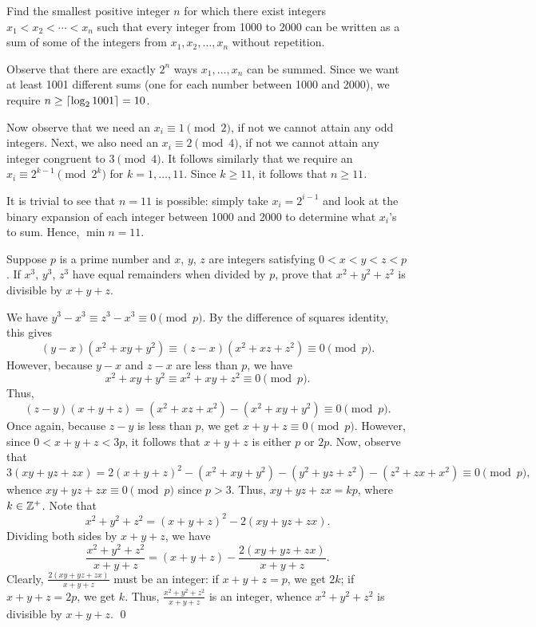 \begin{question}[11]\label{A::2024-S-2-3}
    Find the smallest positive integer $n$ for which there exist integers $x_1 < x_2 < \cdots < x_n$ such that every integer from 1000 to 2000 can be written as a sum of some of the integers from $x_1, x_2, \ldots, x_n$ without repetition.
\end{question}
\begin{solution*}
    Observe that there are exactly $2^n$ ways $x_1, \ldots, x_n$ can be summed. Since we want at least 1001 different sums (one for each number between 1000 and 2000), we require $n \geq \left\lceil \log_2 1001 \right\rceil = 10$.

    Now observe that we need an $x_i \equiv 1 \pmod{2}$, if not we cannot attain any odd integers. Next, we also need an $x_i \equiv 2 \pmod{4}$, if not we cannot attain any integer congruent to $3 \pmod{4}$. It follows similarly that we require an $x_i \equiv 2^{k-1} \pmod{2^k}$ for $k = 1, \ldots, 11$. Since $k \geq 11$, it follows that $n \geq 11$.

    It is trivial to see that $n = 11$ is possible: simply take $x_i = 2^{i-1}$ and look at the binary expansion of each integer between 1000 and 2000 to determine what $x_i$'s to sum. Hence, $\min n = 11$.
\end{solution*}

\begin{question}\label{A::2024-S-2-4}
    Suppose $p$ is a prime number and $x$, $y$, $z$ are integers satisfying $0 < x < y < z < p$. If $x^3$, $y^3$, $z^3$ have equal remainders when divided by $p$, prove that $x^2 + y^2 + z^2$ is divisible by $x + y + z$.
\end{question}

\begin{solution*}
    We have $y^3 - x^3 \equiv z^3 - x^3 \equiv 0 \pmod{p}$. By the difference of squares identity, this gives \[(y-x)(x^2 + xy + y^2) \equiv (z-x)(x^2 + xz + z^2) \equiv 0 \pmod{p}.\] However, because $y - x$ and $z - x$ are less than $p$, we have \[x^2 + xy + y^2 \equiv x^2 + xy + z^2 \equiv 0 \pmod{p}.\] Thus, \[(z-y)(x + y + z) = (x^2 + xz + x^2) - (x^2 + xy + y^2) \equiv 0 \pmod{p}.\] Once again, because $z - y$ is less than $p$, we get $x + y + z \equiv 0 \pmod{p}$. However, since $0 < x + y + z < 3p$, it follows that $x + y + z$ is either $p$ or $2p$. Now, observe that \[3(xy + yz + zx) = 2(x + y + z)^2 - (x^2 + xy + y^2) - (y^2 + yz + z^2) - (z^2 + zx + x^2) \equiv 0 \pmod{p},\] whence $xy + yz + zx \equiv 0 \pmod{p}$ since $p > 3$. Thus, $xy + yz + zx = kp$, where $k \in \mathbb{Z}^+$. Note that \[x^2 + y^2 + z^2 = (x + y + z)^2 - 2(xy + yz + zx).\] Dividing both sides by $x + y + z$, we have \[\frac{x^2 + y^2 + z^2}{x + y + z} = (x + y + z) - \frac{2(xy + yz + zx)}{x + y + z}.\] Clearly, $\frac{2(xy + yz + zx)}{x + y + z}$ must be an integer: if $x + y + z = p$, we get $2k$; if $x + y + z = 2p$, we get $k$. Thus, $\frac{x^2 + y^2 + z^2}{x + y + z}$ is an integer, whence $x^2 + y^2 + z^2$ is divisible by $x + y + z$. \qed 
\end{solution*}

